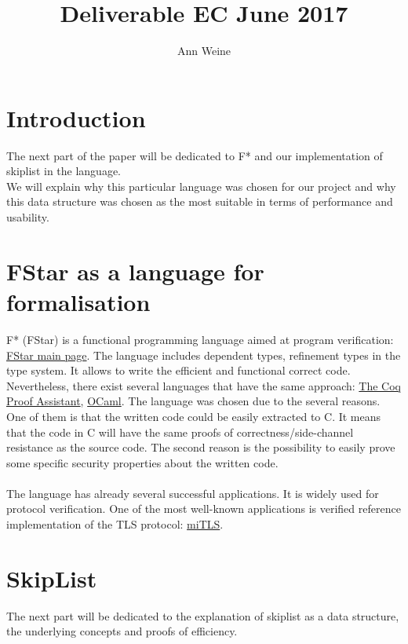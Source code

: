 \documentclass[a4paper]{article}
\title{Deliverable EC June 2017}
\author{Ann Weine}
\begin{document}
\maketitle

\section{Introduction}
The next part of the paper will be dedicated to F* and our implementation of skiplist in the language. \\
We will explain why this particular language was chosen for our project and why this data structure was chosen as the most suitable in terms of performance and usability. 

\section{FStar as a language for formalisation}
F* (FStar) is a functional programming language aimed at program verification: \hyperlink{https://fstar-lang.org/}{FStar main page}. The language includes dependent types, refinement types in the type system. It allows to write the efficient and functional correct code. \\
Nevertheless, there exist several languages that have the same approach: \hyperlink{https://coq.inria.fr/}{The Coq Proof Assistant}, \hyperlink{https://ocaml.org/}{OCaml}. 
The language was chosen due to the several reasons. One of them is that the written code could be easily extracted to C. It means that the code in C will have the same proofs of correctness/side-channel resistance as the source code. 
The second reason is the possibility to easily prove some specific security properties about the written code. \\
\\ The language has already several successful applications. It is widely used for protocol verification. One of the most well-known applications is verified reference implementation of the TLS protocol: \hyperlink{https://mitls.org/}{miTLS}. 

\section{SkipList}
The next part will be dedicated to the explanation of skiplist as a data structure, the underlying concepts and proofs of efficiency. 
\end{document}
